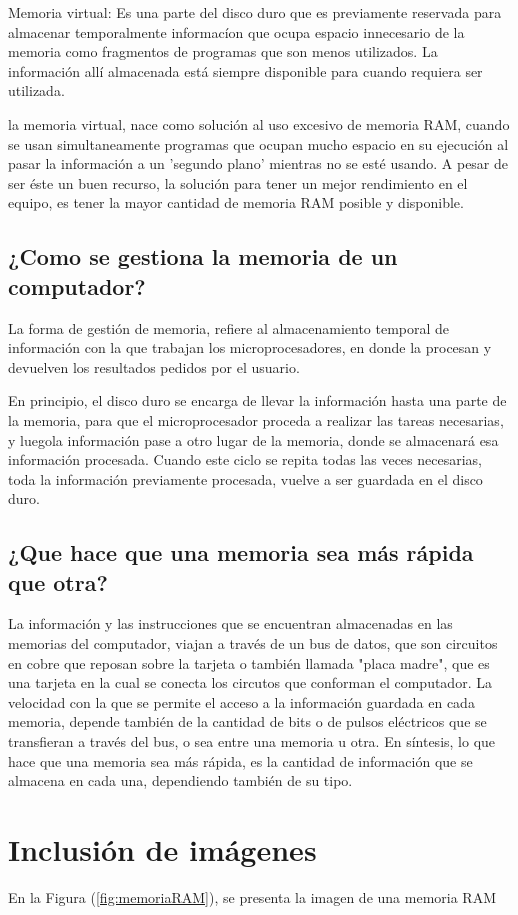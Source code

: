 \documentclass{article}
\begin{document}
Memoria virtual: Es una parte del disco duro que es previamente reservada para almacenar temporalmente informacíon que ocupa espacio innecesario de la memoria como fragmentos de programas que son menos utilizados. La información allí almacenada está siempre disponible para cuando requiera ser utilizada. 

la memoria virtual, nace como solución al uso excesivo de memoria RAM, cuando se usan simultaneamente programas que ocupan mucho espacio en su ejecución al pasar la información a un 'segundo plano' mientras no se esté usando.
A pesar de ser éste un buen recurso, la solución para tener un mejor rendimiento en el equipo, es tener la mayor cantidad de memoria RAM posible y disponible.
 
\subsection{¿Como se gestiona la memoria de un computador?}
%
La forma de gestión de memoria, refiere al almacenamiento temporal de información con la que trabajan los microprocesadores, en donde la procesan y devuelven los resultados pedidos por el usuario.

En principio, el disco duro se encarga de llevar la información hasta una parte de la memoria, para que el microprocesador proceda a realizar las tareas necesarias, y luegola información pase a otro lugar de la memoria, donde se almacenará esa información procesada.
Cuando este ciclo se repita todas las veces necesarias, toda la información previamente procesada, vuelve a ser guardada en el disco duro.

\subsection{¿Que hace que una memoria sea más rápida que otra?}
%
La información y las instrucciones que se encuentran almacenadas en las memorias del computador, viajan a través de un bus de datos, que son circuitos en cobre que reposan sobre la tarjeta o también llamada "placa madre", que es una tarjeta en la cual se conecta los circutos que conforman el computador.
La velocidad con la que se permite el acceso a la información guardada en cada memoria, depende también de la cantidad de bits o de pulsos eléctricos que se transfieran a través del bus, o sea entre una memoria u otra.
En síntesis, lo que hace que una memoria sea más rápida, es la cantidad de información que se almacena en cada una, dependiendo también de su tipo. 


\section{Inclusión de imágenes} \label{imagenes}

En la Figura (\ref{fig:memoriaRAM}), se presenta la imagen de una memoria RAM



\end{document}
